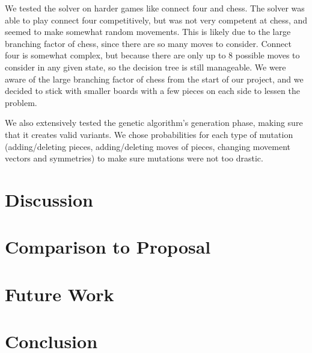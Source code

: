 \documentclass[11pt,letterpaper]{article}
\begin{document}
We tested the solver on harder games like connect four and chess. The solver was able to play connect four competitively, but was not very competent at chess, and seemed to make somewhat random movements. This is likely due to the large branching factor of chess, since there are so many moves to consider. Connect four is somewhat complex, but because there are only up to 8 possible moves to consider in any given state, so the decision tree is still manageable. We were aware of the large branching factor of chess from the start of our project, and we decided to stick with smaller boards with a few pieces on each side to lessen the problem.

We also extensively tested the genetic algorithm's generation phase, making sure that it creates valid variants. We chose probabilities for each type of mutation (adding/deleting pieces, adding/deleting moves of pieces, changing movement vectors and symmetries) to make sure mutations were not too drastic.

\section{Discussion}

\section{Comparison to Proposal}


\section{Future Work}

\section{Conclusion}
\printbibliography
\end{document}
